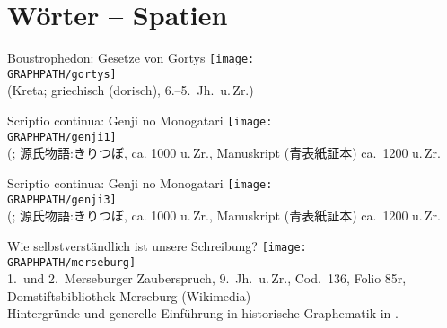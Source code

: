 \section{Wörter -- Spatien}

\begin{frame}
  {Boustrophedon: Gesetze von Gortys}
  \pause
  \centering
  \texttt{[image: \\GRAPHPATH/gortys]}\\
  {\tiny (Kreta; griechisch (dorisch), 6.--5.\ Jh.\ u.\,Zr.)}
\end{frame}

\begin{frame}
  {Scriptio continua: Genji no Monogatari}
  \pause
  \centering
  \texttt{[image: \\GRAPHPATH/genji1]}\\
  {\tiny (\citealt{Rickmeyer1991}; 源氏物語:きりつぼ, ca. 1000 u.\,Zr., Manuskript (青表紙証本) ca.\ 1200 u.\,Zr.}
\end{frame}

\begin{frame}
  {Scriptio continua: Genji no Monogatari}
  \centering
  \texttt{[image: \\GRAPHPATH/genji3]}\\
  {\tiny (\citealt{Rickmeyer1991}; 源氏物語:きりつぼ, ca. 1000 u.\,Zr., Manuskript (青表紙証本) ca.\ 1200 u.\,Zr.}
\end{frame}

\begin{frame}
  {Wie selbstverständlich ist unsere Schreibung?}
  \pause
  \centering
  \texttt{[image: \\GRAPHPATH/merseburg]}\\[0.5\baselineskip]
  {\tiny 1.~und 2.~Merseburger Zauberspruch, 9.~Jh.\ u.\,Zr., Cod.\ 136, Folio 85r, Domstiftsbibliothek Merseburg (Wikimedia)\\[-1\baselineskip]
    Hintergründe und generelle Einführung in historische Graphematik in \citet{Elmentaler2018}.}
\end{frame}

